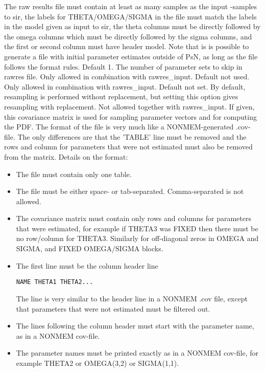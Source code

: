 \begin{optionlist}
The raw results file must contain at least as many 
samples as the input -samples to sir, the labels for  THETA/OMEGA/SIGMA 
in the file must match the labels in the model given as input 
to sir, the theta columns must be directly followed by the omega columns 
which must be directly followed by the sigma columns, and the first or
second column must have header model. Note that is is 
possible to generate a file with initial parameter estimates outside 
of PsN, as long as the file follows the format rules.
\nextopt
{}
Default 1. The number of parameter sets to skip in rawres file. Only allowed in combination with rawres\_input.
\nextopt
{}
Default not used. Only allowed in combination with rawres\_input.
\nextopt
{}
Default not set. By default, resampling is performed without replacement, but setting this option gives resampling with replacement.
\nextopt
{}
Not allowed together with rawres\_input. If given, this covariance matrix is
used for sampling parameter vectors and for computing the PDF. The format of the file is very much like a NONMEM-generated .cov-file. The only differences
are that the 'TABLE' line must be removed and the rows and column for parameters that were not estimated must also be removed from the matrix. Details on the format:
\begin{itemize}
\item The file must contain only one table.
\item The file must be either space- or tab-separated. Comma-separated is not allowed.
\item The covariance matrix must contain only rows and columns for parameters that were estimated, for example if THETA3 was FIXED then there must be no row/column 
for THETA3. Similarly for off-diagonal zeros in OMEGA and SIGMA, and FIXED OMEGA/SIGMA blocks.
\item The first line must be the column header line \begin{verbatim}NAME THETA1 THETA2...\end{verbatim}
The line is very similar to the header line in a NONMEM .cov file, 
except that parameters that were not estimated must be filtered out.
\item The lines following the column header must start with the parameter name, as in a NONMEM cov-file.
\item The parameter names must be printed exactly as in a NONMEM cov-file,  for example THETA2 or OMEGA(3,2) or SIGMA(1,1).

\end{itemize}
\end{optionlist}
